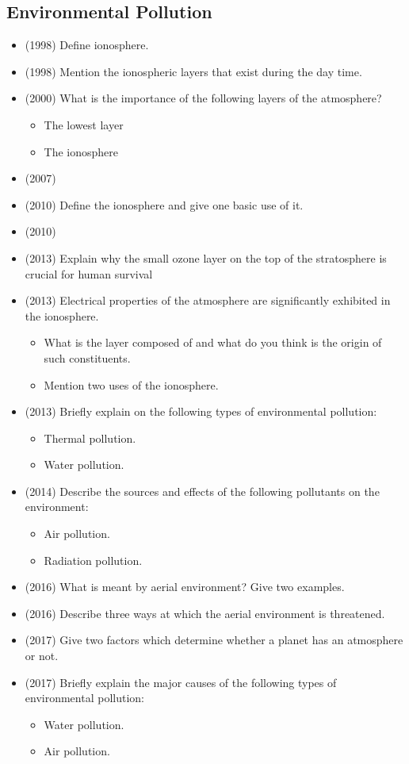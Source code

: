 \documentclass{article}
\begin{document}
\subsection{Environmental Pollution}
\begin{itemize}
\item (1998)  Define ionosphere.
\item (1998)  Mention the ionospheric layers that exist during the day time.
\item (2000)  What is the importance of the following layers of the atmosphere?\begin{itemize}
\item The lowest layer
\item The ionosphere
\end{itemize}
\item (2007)  \item (2010)  Define the ionosphere and give one basic use of it.
\item (2010)  \item (2013)  Explain why the small ozone layer on the top of the stratosphere is crucial for human survival
\item (2013)  Electrical properties of the atmosphere are significantly exhibited in the ionosphere.\begin{itemize}
\item  What is the layer composed of and what do you think is the origin of such constituents.
\item  Mention two uses of the ionosphere.
\end{itemize}
\item (2013)  Briefly explain on the following types of environmental pollution:\begin{itemize}
\item  Thermal pollution.
\item  Water pollution.
\end{itemize}
\item (2014)  Describe the sources and effects of the following pollutants on the environment:\begin{itemize}
\item Air pollution. 
\item Radiation pollution.
\end{itemize}
\item (2016)  What is meant by aerial environment?  Give two examples.
\item (2016)  Describe three ways at which the aerial environment is threatened.
\item (2017)  Give two factors which determine whether a planet has an atmosphere or not.
\item (2017)  Briefly explain the major causes of the following types of environmental pollution:\begin{itemize}
\item Water pollution. 
\item  Air pollution.
\end{itemize}

\end{itemize}
\end{document}
